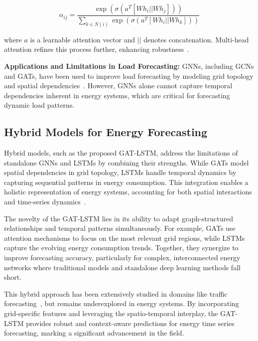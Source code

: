 \documentclass[sigconf,nonacm]{acmart}
\begin{document}
\begin{equation} \alpha_{ij} = \frac{\exp(\sigma(a^T [W h_i || W h_j]))}{\sum_{k \in N(i)} \exp(\sigma(a^T [W h_i || W h_k]))} \label{eq:gat_attention} \end{equation}

where $a$ is a learnable attention vector and $||$ denotes concatenation. Multi-head attention refines this process further, enhancing robustness~\cite{huang2023}.

\textbf{Applications and Limitations in Load Forecasting:} GNNs, including GCNs and GATs, have been used to improve load forecasting by modeling grid topology and spatial dependencies~\cite{Mansoor2024, Liao2021,huang2023}. However, GNNs alone cannot capture temporal dependencies inherent in energy systems, which are critical for forecasting dynamic load patterns.

\subsection{Hybrid Models for Energy Forecasting}

Hybrid models, such as the proposed GAT-LSTM, address the limitations of standalone GNNs and LSTMs by combining their strengths. While GATs model spatial dependencies in grid topology, LSTMs handle temporal dynamics by capturing sequential patterns in energy consumption. This integration enables a holistic representation of energy systems, accounting for both spatial interactions and time-series dynamics~\cite{Mansoor2024,Eandi2022, Lin2021, huang2023}.

The novelty of the GAT-LSTM lies in its ability to adapt graph-structured relationships and temporal patterns simultaneously. For example, GATs use attention mechanisms to focus on the most relevant grid regions, while LSTMs capture the evolving energy consumption trends. Together, they synergize to improve forecasting accuracy, particularly for complex, interconnected energy networks where traditional models and standalone deep learning methods fall short.

This hybrid approach has been extensively studied in domains like traffic forecasting~\cite{wu2018,zhu2024,zhang2020}, but remains underexplored in energy systems. By incorporating grid-specific features and leveraging the spatio-temporal interplay, the GAT-LSTM provides robust and context-aware predictions for energy time series forecasting, marking a significant advancement in the field.
\end{document}

